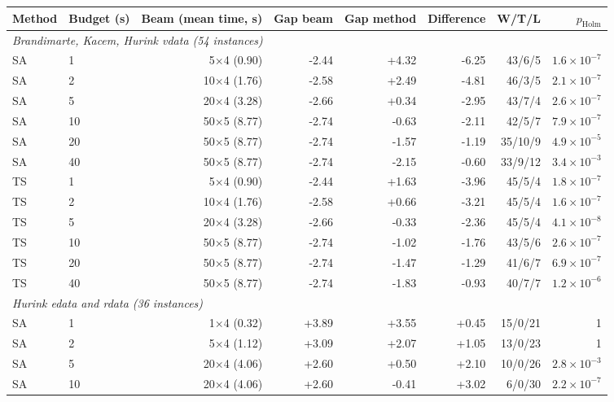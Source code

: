 \begin{tabular}{llrrrrrr}
\toprule
Method & Budget (s) & Beam (mean time, s) & Gap beam & Gap method & Difference & W/T/L & $p_{\mathrm{Holm}}$ \\
\midrule
\multicolumn{8}{l}{\emph{Brandimarte, Kacem, Hurink vdata (54 instances)}} \\
SA & 1 & 5$\times$4 (0.90) & -2.44 & +4.32 & -6.25 & 43/6/5 & $1.6 \times 10^{-7}$ \\
SA & 2 & 10$\times$4 (1.76) & -2.58 & +2.49 & -4.81 & 46/3/5 & $2.1 \times 10^{-7}$ \\
SA & 5 & 20$\times$4 (3.28) & -2.66 & +0.34 & -2.95 & 43/7/4 & $2.6 \times 10^{-7}$ \\
SA & 10 & 50$\times$5 (8.77) & -2.74 & -0.63 & -2.11 & 42/5/7 & $7.9 \times 10^{-7}$ \\
SA & 20 & 50$\times$5 (8.77) & -2.74 & -1.57 & -1.19 & 35/10/9 & $4.9 \times 10^{-5}$ \\
SA & 40 & 50$\times$5 (8.77) & -2.74 & -2.15 & -0.60 & 33/9/12 & $3.4 \times 10^{-3}$ \\
TS & 1 & 5$\times$4 (0.90) & -2.44 & +1.63 & -3.96 & 45/5/4 & $1.8 \times 10^{-7}$ \\
TS & 2 & 10$\times$4 (1.76) & -2.58 & +0.66 & -3.21 & 45/5/4 & $1.6 \times 10^{-7}$ \\
TS & 5 & 20$\times$4 (3.28) & -2.66 & -0.33 & -2.36 & 45/5/4 & $4.1 \times 10^{-8}$ \\
TS & 10 & 50$\times$5 (8.77) & -2.74 & -1.02 & -1.76 & 43/5/6 & $2.6 \times 10^{-7}$ \\
TS & 20 & 50$\times$5 (8.77) & -2.74 & -1.47 & -1.29 & 41/6/7 & $6.9 \times 10^{-7}$ \\
TS & 40 & 50$\times$5 (8.77) & -2.74 & -1.83 & -0.93 & 40/7/7 & $1.2 \times 10^{-6}$ \\
\midrule
\multicolumn{8}{l}{\emph{Hurink edata and rdata (36 instances)}} \\
SA & 1 & 1$\times$4 (0.32) & +3.89 & +3.55 & +0.45 & 15/0/21 & 1 \\
SA & 2 & 5$\times$4 (1.12) & +3.09 & +2.07 & +1.05 & 13/0/23 & 1 \\
SA & 5 & 20$\times$4 (4.06) & +2.60 & +0.50 & +2.10 & 10/0/26 & $2.8 \times 10^{-3}$ \\
SA & 10 & 20$\times$4 (4.06) & +2.60 & -0.41 & +3.02 & 6/0/30 & $2.2 \times 10^{-7}$ \\

\end{tabular}
